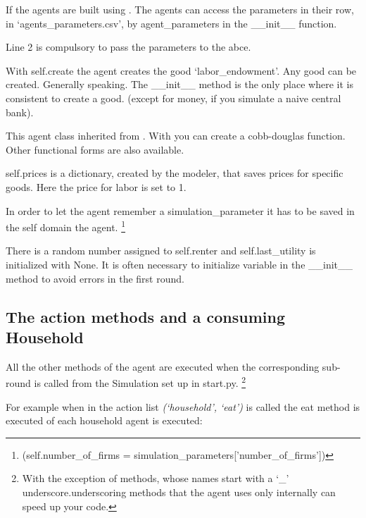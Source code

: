 \documentclass[letterpaper,10pt,english]{sphinxmanual}
\begin{document}
If the agents are built using {\hyperref[simulation:abce.Simulation.build_agents_from_file]{}}. The agents
can access the parameters in their row, in `agents\_parameters.csv', by
agent\_parameters in the \_\_init\_\_ function.

Line 2 is compulsory to pass the parameters to the abce.

With self.create the agent creates the good `labor\_endowment'. Any
good can be created. Generally speaking. The \_\_init\_\_ method is the only place
where it is consistent to create a good. (except for money, if you simulate a naive
central bank).

This agent class inherited {\hyperref[Household:abce.Household.set_cobb_douglas_utility_function]{}}
from {\hyperref[Household:abce.Household]{}}. With
{\hyperref[Household:abce.Household.set_cobb_douglas_utility_function]{}} you can create a
cobb-douglas function. Other functional forms are also available.

self.prices is a dictionary, created by the modeler, that saves prices for
specific goods. Here the price for labor is set to 1.

In order to let the agent remember a simulation\_parameter it has to be saved in the self
domain the agent.  \footnote{
(self.number\_of\_firms = simulation\_parameters{[}'number\_of\_firms'{]})
}

There is a random number assigned to self.renter and self.last\_utility is initialized
with None. It is often necessary to initialize variable in the \_\_init\_\_ method to
avoid errors in the first round.


\subsection{The action methods and a consuming Household}
\label{Walk_through:the-action-methods-and-a-consuming-household}
All the other methods of the agent are executed when the corresponding sub-round is
called from the Simulation set up in start.py.  \footnote{
With the exception of methods, whose names start with a `\_' underscore.underscoring methods that the agent uses only internally can speed up your code.
}

For example when in the action list \emph{(`household', `eat')} is called the eat method
is executed of each household agent is executed:
\end{document}
